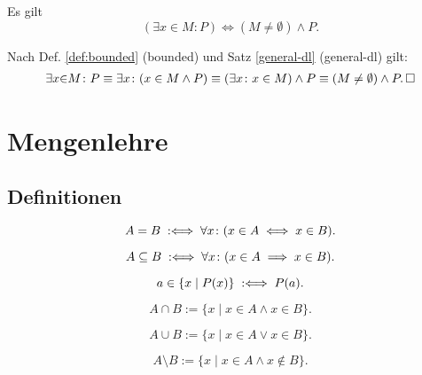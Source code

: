 \begin{Satz}
Es gilt
\[(\exists x{\in}M\colon P) \iff (M\ne\emptyset)\land P.\]
\end{Satz}

\begin{Beweis}
Nach Def. \ref{def:bounded} (bounded) und Satz
\ref{general-dl} (general-dl) gilt:
\begin{gather*}
\exists x{\in}M\colon P \equiv \exists x\colon (x\in M\land P)
\equiv (\exists x\colon x\in M)\land P\equiv (M\ne\emptyset)\land P.\,\square
\end{gather*}
\end{Beweis}

\newpage
\section{Mengenlehre}
\subsection{Definitionen}

\begin{Definition}
\label{def:seteq}
\[A=B \;:\Longleftrightarrow\; \forall x\colon (x\in A\iff x\in B).\]
\end{Definition}

\begin{Definition}%
\label{def:subseteq}
\[A\subseteq B \;:\Longleftrightarrow\; \forall x\colon (x\in A\implies x\in B).\]
\end{Definition}

\begin{Definition}\label{def:filter}
\[a\in\{x\mid P(x)\} \;:\Longleftrightarrow\; P(a).\]
\end{Definition}

\begin{Definition}%
\label{def:cap}
\[A\cap B := \{x\mid x\in A\land x\in B\}.\]
\end{Definition}

\begin{Definition}%
\label{def:cup}
\[A\cup B := \{x\mid x\in A\lor x\in B\}.\]
\end{Definition}

\begin{Definition}%
\label{def:set-diff}
\[A\setminus B := \{x\mid x\in A\land x\notin B\}.\]
\end{Definition}

